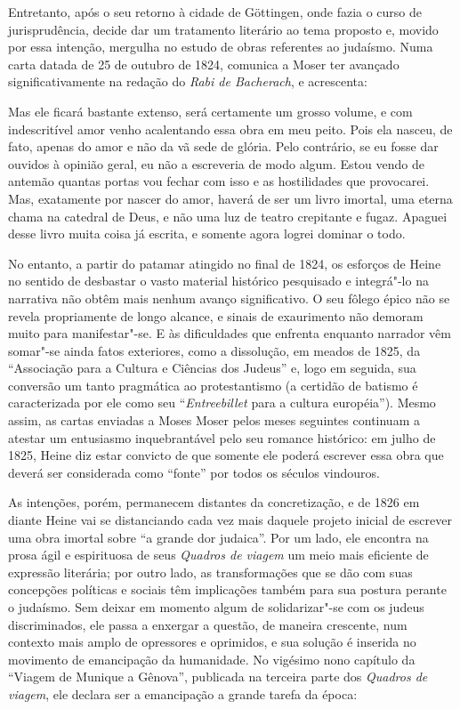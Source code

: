 Entretanto, após o seu retorno à cidade de Göttingen, onde fazia o curso
de jurisprudência, decide dar um tratamento literário ao tema proposto
e, movido por essa intenção, mergulha no estudo de obras referentes ao
judaísmo. Numa carta datada de 25 de outubro de 1824, comunica a Moser
ter avançado significativamente na redação do \textit{Rabi de
Bacherach}, e acrescenta: 
\begin{hedraquote}
Mas ele ficará bastante extenso, será
certamente um grosso volume, e com indescritível amor venho acalentando
essa obra em meu peito. Pois ela nasceu, de fato, apenas do amor e não
da vã sede de glória. Pelo contrário, se eu fosse dar ouvidos à opinião
geral, eu não a escreveria de modo algum. Estou vendo de antemão
quantas portas vou fechar com isso e as hostilidades que provocarei.
Mas, exatamente por nascer do amor, haverá de ser um livro imortal, uma
eterna chama na catedral de Deus, e não uma luz de teatro crepitante e
fugaz. Apaguei desse livro muita coisa já escrita, e somente agora
logrei dominar o todo.
\end{hedraquote}

No entanto, a partir do patamar atingido no final de 1824, os esforços
de Heine no sentido de desbastar o vasto material histórico pesquisado
e integrá"-lo na narrativa não obtêm mais nenhum avanço significativo.
O seu fôlego épico não se revela propriamente de longo alcance, e
sinais de exaurimento não demoram muito para manifestar"-se. E  às
dificuldades que enfrenta enquanto narrador vêm somar"-se ainda fatos
exteriores, como a dissolução, em meados de 1825, da “Associação para a
Cultura e Ciências dos Judeus” e, logo em seguida, sua conversão um
tanto pragmática ao protestantismo (a certidão de batismo é
caracterizada por ele como seu “\textit{Entreebillet} para a cultura
européia”). Mesmo assim, as cartas enviadas a Moses Moser pelos meses
seguintes continuam a atestar um entusiasmo inquebrantável pelo seu
romance histórico: em julho de 1825, Heine diz estar convicto de que
somente ele poderá escrever essa obra que deverá ser considerada como
“fonte” por todos os séculos vindouros.

As intenções, porém, permanecem distantes da concretização, e de 1826 em
diante Heine vai se distanciando cada vez mais daquele projeto inicial
de escrever uma obra imortal sobre “a grande dor judaica”. Por um lado,
ele encontra na prosa ágil e espirituosa de seus \textit{Quadros de
viagem} um meio mais eficiente de expressão literária; por outro lado,
as transformações que se dão com suas concepções políticas e sociais
têm implicações também para sua postura perante o judaísmo. Sem deixar
em momento algum de solidarizar"-se com os judeus discriminados, ele
passa a enxergar a questão, de maneira crescente, num contexto mais
amplo de opressores e oprimidos, e sua solução é inserida no movimento
de emancipação da humanidade. No vigésimo nono capítulo da “Viagem de
Munique a Gênova”, publicada na terceira parte dos \textit{Quadros de
viagem}, ele declara ser a emancipação a grande tarefa da época: 

